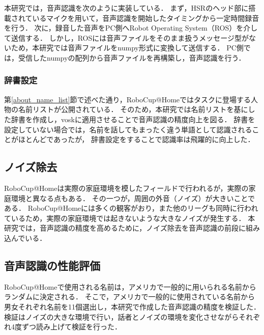 \documentclass[a4j]{jarticle}
\begin{document}
本研究では，音声認識を次のように実装している．
まず，HSRのヘッド部に搭載されているマイクを用いて，音声認識を開始したタイミングから一定時間録音を行う．
次に，録音した音声をPC側へRobot Operating System（ROS）\cite{ros_wiki}を介して送信する．
しかし，ROSには音声ファイルをそのまま扱うメッセージ型がないため，本研究では音声ファイルをnumpy形式に変換して送信する．
PC側では，受信したnumpyの配列から音声ファイルを再構築し，音声認識を行う．

\subsubsection{辞書設定}
第\ref{about_name_list}節で述べた通り，RoboCup@Homeではタスクに登場する人物の名前リストが公開されている．
そのため，本研究では名前リストを基にした辞書を作成し，voskに適用させることで音声認識の精度向上を図る．
辞書を設定していない場合では，名前を話してもまったく違う単語として認識されることがほとんどであったが，
辞書設定をすることで認識率は飛躍的に向上した．

\subsection{ノイズ除去}
RoboCup@Homeは実際の家庭環境を模したフィールドで行われるが，実際の家庭環境と異なる点もある．
その一つが，周囲の外音（ノイズ）が大きいことである．
RoboCup@Homeには多くの観客がおり，また他のリーグも同時に行われているため，実際の家庭環境では起きないような大きなノイズが発生する．
本研究では，音声認識の精度を高めるために，ノイズ除去\cite{sainburg2020finding}を音声認識の前段に組み込んでいる．

\subsection{音声認識の性能評価}
RoboCup@Homeで使用される名前は，アメリカで一般的に用いられる名前からランダムに決定される．
そこで，アメリカで一般的に使用されている名前から男女それぞれ名前を11個選出し，本研究で作成した音声認識の精度を検証した．
検証はノイズの大きな環境で行い，話者とノイズの環境を変化させながらそれぞれ4度ずつ読み上げて検証を行った．
\end{document}
